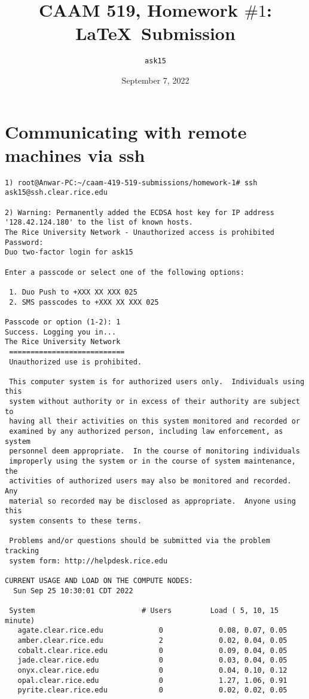\documentclass{article}
\title{CAAM 519, Homework $\#1$: \LaTeX ~Submission}
\author{\texttt{ask15}}
\date{September 7, 2022}
\begin{document}
\maketitle
\section{Communicating with remote machines via ssh}

\begin{verbatim}
1) root@Anwar-PC:~/caam-419-519-submissions/homework-1# ssh ask15@ssh.clear.rice.edu

2) Warning: Permanently added the ECDSA host key for IP address 
'128.42.124.180' to the list of known hosts.
The Rice University Network - Unauthorized access is prohibited
Password:
Duo two-factor login for ask15

Enter a passcode or select one of the following options:

 1. Duo Push to +XXX XX XXX 025
 2. SMS passcodes to +XXX XX XXX 025

Passcode or option (1-2): 1
Success. Logging you in...
The Rice University Network
 ===========================
 Unauthorized use is prohibited.

 This computer system is for authorized users only.  Individuals using this
 system without authority or in excess of their authority are subject to
 having all their activities on this system monitored and recorded or
 examined by any authorized person, including law enforcement, as system
 personnel deem appropriate.  In the course of monitoring individuals
 improperly using the system or in the course of system maintenance, the
 activities of authorized users may also be monitored and recorded.  Any
 material so recorded may be disclosed as appropriate.  Anyone using this
 system consents to these terms.

 Problems and/or questions should be submitted via the problem tracking
 system form: http://helpdesk.rice.edu

CURRENT USAGE AND LOAD ON THE COMPUTE NODES:
  Sun Sep 25 10:30:01 CDT 2022

 System                         # Users         Load ( 5, 10, 15 minute)
   agate.clear.rice.edu             0             0.08, 0.07, 0.05
   amber.clear.rice.edu             2             0.02, 0.04, 0.05
   cobalt.clear.rice.edu            0             0.09, 0.04, 0.05
   jade.clear.rice.edu              0             0.03, 0.04, 0.05
   onyx.clear.rice.edu              0             0.04, 0.10, 0.12
   opal.clear.rice.edu              0             1.27, 1.06, 0.91
   pyrite.clear.rice.edu            0             0.02, 0.02, 0.05


\end{verbatim}
\end{document}
